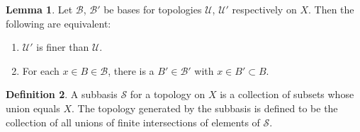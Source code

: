 \documentclass[twocolumn]{article}
\theoremstyle{definition}
\newtheorem{definition}{Definition}[section]
\newtheorem{lemma}[definition]{Lemma}
\begin{document}
\begin{lemma}
    Let $\mathcal{B}$, $\mathcal{B}'$ be bases for topologies $\mathcal{U}$, $\mathcal{U}'$ respectively on $X$. Then the following are equivalent:
    \begin{enumerate}[noitemsep]
            \item $\mathcal{U}'$ is finer than $\mathcal{U}$.
            \item For each $x \in B \in \mathcal{B}$, there is a $B' \in \mathcal{B'}$ with $x \in B' \subset B$.
    \end{enumerate}
\end{lemma}
\begin{definition}
    A subbasis $\mathcal{S}$ for a topology on $X$ is a collection of subsets whose union equals $X$.
    The topology generated by the subbasis is defined to be the collection of all unions of finite intersections of elements of $\mathcal{S}$.
\end{definition}
\end{document}
